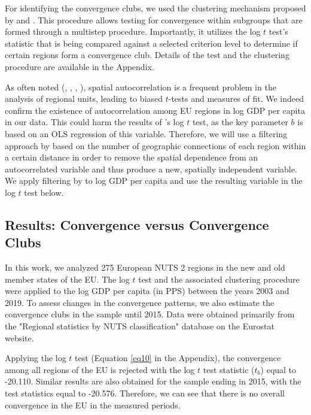 \documentclass[11pt]{article}
\begin{document}
For identifying the convergence clubs, we used the clustering mechanism proposed by \citet{phillips2009economic} and \citet{bartkowska2012regional}. This procedure allows testing for convergence within subgroups that are formed through a multistep procedure. Importantly, it utilizes the log $t$ test's statistic that is being compared against a selected criterion level to determine if certain regions form a convergence club. Details of the test and the clustering procedure are available in the Appendix.

As often noted (\citet{dall2008regional}, \citet{magrini2004regional}, \citet{anselin1991properties}, \citet{anselin2001spatial}), spatial autocorrelation is a frequent problem in the analysis of regional units, leading to biased $t$-tests and measures of fit. We indeed confirm the existence of autocorrelation among EU regions in log GDP per capita in our data. This could harm the results of \citeauthor{phillips2007transition}'s log $t$ test, as the key parameter $b$ is based on an OLS regression of this variable. Therefore, we will use a filtering approach by \cite{getis2002comparative} based on the number of geographic connections of each region within a certain distance in order to remove the spatial dependence from an autocorrelated variable and thus produce a new, spatially independent variable. We apply filtering by \cite{getis2002comparative} to log GDP per capita and use the resulting variable in the log $t$ test below.



\subsection{Results: Convergence versus Convergence Clubs}
In this work, we analyzed 275 European NUTS 2 regions in the new and old member states of the EU. The log $t$ test and the associated clustering procedure were applied to the log GDP per capita (in PPS) between the years 2003 and 2019. To assess changes in the convergence patterns, we also estimate the convergence clubs in the sample until 2015. Data were obtained primarily from the "Regional statistics by NUTS classification" database on the Eurostat website.


Applying the log $t$ test (Equation \ref{eq10} in the Appendix), the convergence among all regions of the EU is rejected with the log $t$ test statistic ($t_b$) equal to -20.110. Similar results are also obtained for the sample ending in 2015, with the test statistics equal to -20.576. Therefore, we can see that there is no overall convergence in the EU in the measured periods.
\end{document}
